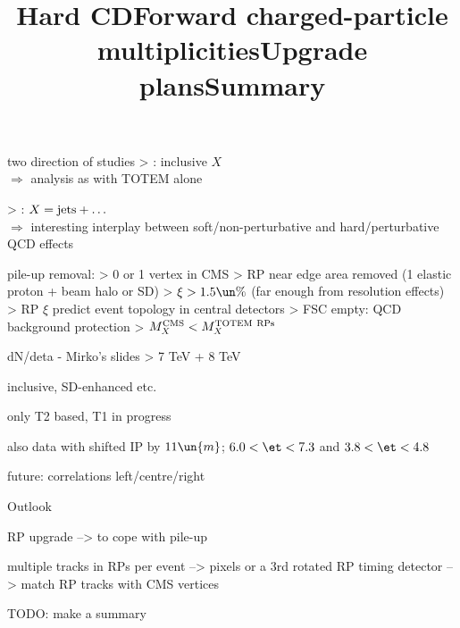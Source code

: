 \> two direction of studies
\>> : inclusive $X$\\
$\Rightarrow$ analysis as with TOTEM alone

\>> : $X = \hbox{jets} + \ldots$\\
$\Rightarrow$ interesting interplay between soft/non-perturbative and hard/perturbative QCD effects


\newpage %
\title{Hard CD}

\vskip-3mm


\vskip-5mm
\> pile-up removal:
\>> 0 or 1 vertex in CMS
\>> RP near edge area removed (1 elastic proton + beam halo or SD)
\>> $\xi > 1.5\un{\%}$ (far enough from resolution effects)
\>> RP $\xi$ predict event topology in central detectors
\>> FSC empty: QCD background protection
\>> $M_X^{\rm CMS} < M_X^{\rm TOTEM\ RPs}$

\newpage %
\hbox{}
\vfil
\title{Forward charged-particle multiplicities}


\newpage %
\title{}

\> dN/deta - Mirko's slides
\>> 7 TeV + 8 TeV

\> inclusive, SD-enhanced etc.

\> only T2 based, T1 in progress

\> also data with shifted IP by $11\un{m}$; $6.0 < \et < 7.3$ and  $3.8 < \et < 4.8$

\> future: correlations left/centre/right

\newpage %
\hbox{}
\vfil

\vskip2mm
\centerline{\PartFont\cYe Outlook\cFg}


\vfil

\newpage %
\title{Upgrade plans}

RP upgrade --> to cope with pile-up

\> multiple tracks in RPs per event --> pixels or a 3rd rotated RP
\> timing detector --> match RP tracks with CMS vertices

\newpage %
\title{}


\newpage %
\title{Summary}

TODO: make a summary

\vfil
\eject
\bye
